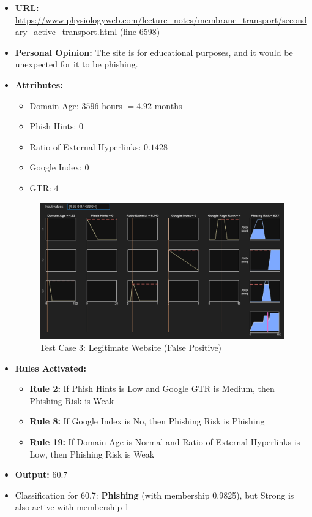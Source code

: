 \documentclass[11pt]{article}
\begin{document}
\begin{itemize}
    \item \textbf{URL:} \url{https://www.physiologyweb.com/lecture_notes/membrane_transport/secondary_active_transport.html} (line 6598)
    \item \textbf{Personal Opinion:} The site is for educational purposes, and it would be unexpected for it to be phishing. 
    \item \textbf{Attributes:}
    \begin{itemize}
        \item Domain Age: $3596$ hours $= 4.92$ months
        \item Phish Hints: $0$
        \item Ratio of External Hyperlinks: $0.1428$
        \item Google Index: $0$
        \item GTR: $4$
    \end{itemize}
    \begin{figure}[h!]
        \centering
        \includegraphics[width=\textwidth]{test-3.png}
        \caption{Test Case 3: Legitimate Website (False Positive)}
    \end{figure}
    \item \textbf{Rules Activated:} 
    \begin{itemize}
        \item \textbf{Rule 2:} If Phish Hints is Low and Google GTR is Medium, then Phishing Risk is Weak
        \item \textbf{Rule 8:} If Google Index is No, then Phishing Risk is Phishing
        \item \textbf{Rule 19:} If Domain Age is Normal and Ratio of External Hyperlinks is Low, then Phishing Risk is Weak
    \end{itemize}
    \item \textbf{Output:} $60.7$
    \item Classification for 60.7: \textbf{Phishing} (with membership 0.9825), but Strong is also active with membership 1
\end{itemize}
\end{document}
